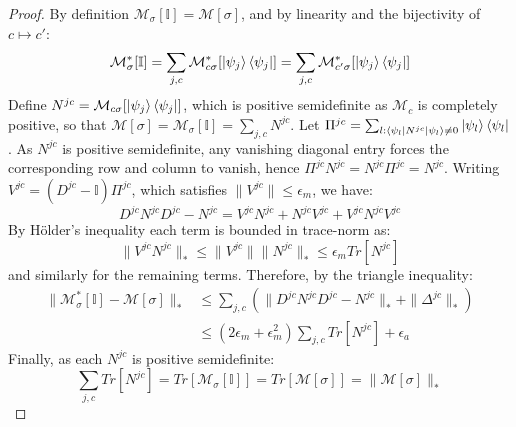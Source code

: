 \documentclass[aps,floatfix,10pt,amssymb,amsfont,amsmath,superscriptaddress,float,nofootinbib,longbibliography,nobalancelastpage,twocolumn]{revtex4-2}
\begin{document}
\begin{proof}
    By definition $\mathcal{M}_{\sigma}[\mathbb{I}] = \mathcal{M}[\sigma]$, and by linearity and the bijectivity of $c \mapsto c'$:
    \begin{equation}
        \mathcal{M}^*_{\sigma}[\mathbb{I}] = \sum_{j,c}\mathcal{M}^*_{c\sigma}[\ket{\psi_j}\bra{\psi_j}] = \sum_{j,c}\mathcal{M}^*_{c'\sigma}[\ket{\psi_j}\bra{\psi_j}]
    \end{equation}
    Define $N^{jc} = \mathcal{M}_{c\sigma}[\ket{\psi_j}\bra{\psi_j}]$, which is positive semidefinite as $\mathcal{M}_c$ is completely positive, so that $\mathcal{M}[\sigma] = \mathcal{M}_{\sigma}[\mathbb{I}] = \sum_{j,c}N^{jc}$. Let $\Pi^{jc} = \sum_{l:\bra{\psi_l}N^{jc}\ket{\psi_l}\neq0}\ket{\psi_l}\bra{\psi_l}$. As $N^{jc}$ is positive semidefinite, any vanishing diagonal entry forces the corresponding row and column to vanish, hence $\Pi^{jc}N^{jc} = N^{jc}\Pi^{jc} = N^{jc}$. Writing $V^{jc} = (D^{jc}-\mathbb{I})\Pi^{jc}$, which satisfies $\|V^{jc}\|\leq\epsilon_m$, we have:
    \begin{equation}
        D^{jc}N^{jc}D^{jc} - N^{jc} = V^{jc}N^{jc} + N^{jc}V^{jc} + V^{jc}N^{jc}V^{jc}
    \end{equation}
    By H\"older's inequality each term is bounded in trace-norm as:
    \begin{equation}
        \|V^{jc}N^{jc}\|_* \leq \|V^{jc}\|\|N^{jc}\|_* \leq \epsilon_m Tr[N^{jc}]
    \end{equation}
    and similarly for the remaining terms. Therefore, by the triangle inequality:
    \begin{align}
        \|\mathcal{M}^*_{\sigma}[\mathbb{I}]-\mathcal{M}[\sigma]\|_* &\leq \sum_{j,c}\left(\|D^{jc}N^{jc}D^{jc}-N^{jc}\|_* + \|\Delta^{jc}\|_*\right)\\
        &\leq (2\epsilon_m+\epsilon_m^2)\sum_{j,c}Tr[N^{jc}] + \epsilon_a
    \end{align}
    Finally, as each $N^{jc}$ is positive semidefinite:
    \begin{equation}
        \sum_{j,c}Tr[N^{jc}] = Tr[\mathcal{M}_{\sigma}[\mathbb{I}]] = Tr[\mathcal{M}[\sigma]] = \|\mathcal{M}[\sigma]\|_*
    \end{equation}
\end{proof}
\end{document}
